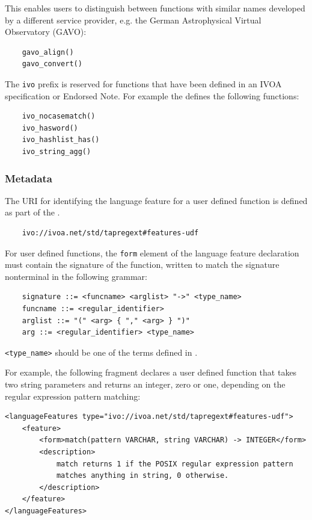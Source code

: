 \documentclass[11pt,a4paper]{ivoa}
\begin{document}
This enables users to distinguish between functions with similar names developed
by a different service provider, e.g. the German Astrophysical Virtual
Observatory (GAVO):
\begin{verbatim}
    gavo_align()
    gavo_convert()
\end{verbatim}

The \verb:ivo: prefix is reserved for functions that have been defined in an
IVOA specification or Endorsed Note. For example the \CatalogueUDF{} defines the
following functions:
\begin{verbatim}
    ivo_nocasematch()
    ivo_hasword()
    ivo_hashlist_has()
    ivo_string_agg()
\end{verbatim}


\subsubsection{Metadata}
\label{sec:user.metadata}

The URI for identifying the language feature for a user defined function
is defined as part of the \TAPRegSpec{}.

\begin{verbatim}
    ivo://ivoa.net/std/tapregext#features-udf
\end{verbatim}

For user defined functions, the \verb:form: element of the language feature
declaration must contain the signature of the function, written to match
the signature nonterminal in the following grammar:
\begin{verbatim}
    signature ::= <funcname> <arglist> "->" <type_name>
    funcname ::= <regular_identifier>
    arglist ::= "(" <arg> { "," <arg> } ")"
    arg ::= <regular_identifier> <type_name>
\end{verbatim}

\verb:<type_name>: should be one of the terms defined in .

For example, the following fragment declares a user defined function that
takes two string parameters and returns an integer, zero or one,
depending on the regular expression pattern matching:
\begin{verbatim}
<languageFeatures type="ivo://ivoa.net/std/tapregext#features-udf">
    <feature>
        <form>match(pattern VARCHAR, string VARCHAR) -> INTEGER</form>
        <description>
            match returns 1 if the POSIX regular expression pattern
            matches anything in string, 0 otherwise.
        </description>
    </feature>
</languageFeatures>
\end{verbatim}
\end{document}
